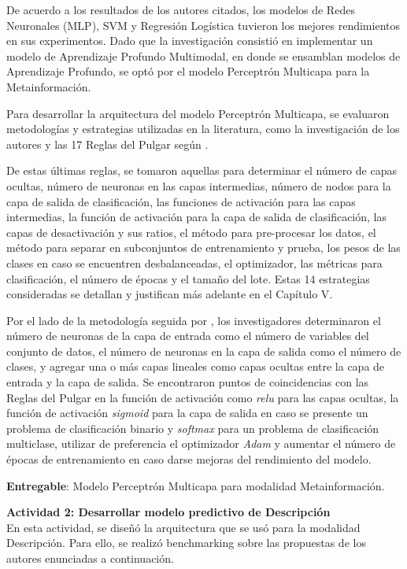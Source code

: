 De acuerdo a los resultados de los autores citados, los modelos de Redes Neuronales (MLP), SVM y Regresión Logística tuvieron los mejores rendimientos en sus experimentos. Dado que la investigación consistió en implementar un modelo de Aprendizaje Profundo Multimodal, en donde se ensamblan modelos de Aprendizaje Profundo, se optó por el modelo Perceptrón Multicapa para la Metainformación.

Para desarrollar la arquitectura del modelo Perceptrón Multicapa, se evaluaron metodologías y estrategias utilizadas en la literatura, como la investigación de los autores \cite{pr_yu2018deeplearning} y las 17 Reglas del Pulgar según \cite{tec_ranjan2019thumbrules}.

De estas últimas reglas, se tomaron aquellas para determinar el número de capas ocultas, número de neuronas en las capas intermedias, número de nodos para la capa de salida de clasificación, las funciones de activación para las capas intermedias, la función de activación para la capa de salida de clasificación, las capas de desactivación y sus ratios, el método para pre-procesar los datos, el método para separar en subconjuntos de entrenamiento y prueba, los pesos de las clases en caso se encuentren desbalanceadas, el optimizador, las métricas para clasificación, el número de épocas y el tamaño del lote. Estas 14 estrategias consideradas se detallan y justifican más adelante en el Capítulo V.

Por el lado de la metodología seguida por \citeauthor{pr_yu2018deeplearning}, los investigadores determinaron el número de neuronas de la capa de entrada como el número de variables del conjunto de datos, el número de neuronas en la capa de salida como el número de clases, y agregar una o más capas lineales como capas ocultas entre la capa de entrada y la capa de salida. Se encontraron puntos de coincidencias con las Reglas del Pulgar en la función de activación como \textit{relu} para las capas ocultas, la función de activación \textit{sigmoid} para la capa de salida en caso se presente un problema de clasificación binario y \textit{softmax} para un problema de clasificación multiclase, utilizar de preferencia el optimizador \textit{Adam} y aumentar el número de épocas de entrenamiento en caso darse mejoras del rendimiento del modelo.

\textbf{Entregable}: Modelo Perceptrón Multicapa para modalidad Metainformación.

\textbf{Actividad 2: Desarrollar modelo predictivo de Descripción}
\\
En esta actividad, se diseñó la arquitectura que se usó para la modalidad Descripción. Para ello, se realizó benchmarking sobre las propuestas de los autores enunciadas a continuación.

